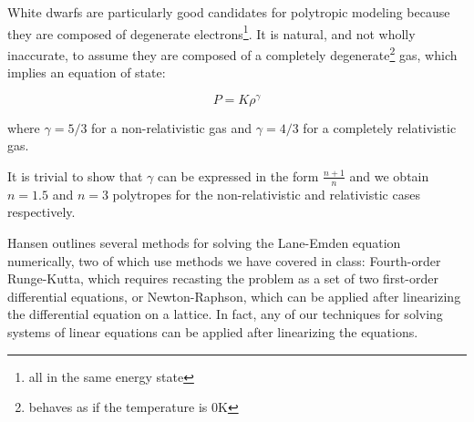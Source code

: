 \documentclass{article}
\begin{document}
        White dwarfs are particularly good candidates for polytropic modeling
        because they are composed of degenerate electrons\footnote{all in the
        same energy state}. It is natural, and not wholly inaccurate, to assume
        they are composed of a completely degenerate\footnote{behaves as if the
        temperature is 0K} gas, which implies an equation of
        state\cite[pp.163-166]{hansen2004}:

        \begin{equation}
            \label{eq:whitedwarf}
            P=K\rho^{\gamma}
        \end{equation}

        where \(\gamma=5/3\) for a non-relativistic gas and \(\gamma=4/3\) for a
        completely relativistic gas.

        It is trivial to show that \(\gamma\) can be expressed in the form
        \(\frac{n+1}{n}\) and we obtain \(n=1.5\) and \(n=3\) polytropes for the
        non-relativistic and relativistic cases respectively.

        Hansen outlines several methods for solving the Lane-Emden equation
        numerically, two of which use methods we have covered in
        class\cite[pp.338-351]{hansen2004}: Fourth-order Runge-Kutta, which requires
        recasting the problem as a set of two first-order differential
        equations, or Newton-Raphson, which can be applied after linearizing the
        differential equation on a lattice. In fact, any of our techniques for
        solving systems of linear equations can be applied after linearizing the
        equations.


    
    
\end{document}
